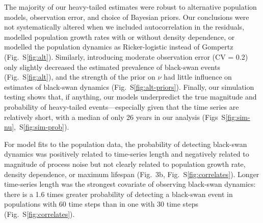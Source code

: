 The majority of our heavy-tailed estimates were robust to alternative
population models, observation error, and choice of Bayesian priors. Our
conclusions were not systematically altered when we included autocorrelation
in the residuals, modelled population growth rates with or without
density dependence, or modelled the population dynamics as Ricker-logistic
instead of Gompertz (Fig.~S\ref{fig:alt}). Similarly, introducing moderate
observation error (CV = 0.2) only slightly decreased the estimated prevalence
of black-swan events (Fig.~S\ref{fig:alt}), and the strength of the prior on
\(\nu\) had little influence on estimates of black-swan dynamics
(Fig.~S\ref{fig:alt-priors}). Finally, our simulation testing shows that, if
anything, our models underpredict the true magnitude and probability of
heavy-tailed events---especially given that the time series are relatively short,
with a median of only 26
years in our analysis (Figs~S\ref{fig:sim-nu},~S\ref{fig:sim-prob}).


For model fits to the population data, the probability of detecting black-swan
dynamics was positively related to time-series length and negatively related to
magnitude of process noise but not clearly related to population growth rate,
density dependence, or maximum lifespan (Fig.~3b, Fig.~S\ref{fig:correlates}).
Longer time-series length was the strongest covariate of observing black-swan
dynamics: there is a 1.6 times greater probability of detecting a black-swan
event in populations with 60 time steps than in one with 30 time steps
(Fig.~S\ref{fig:correlates}).

